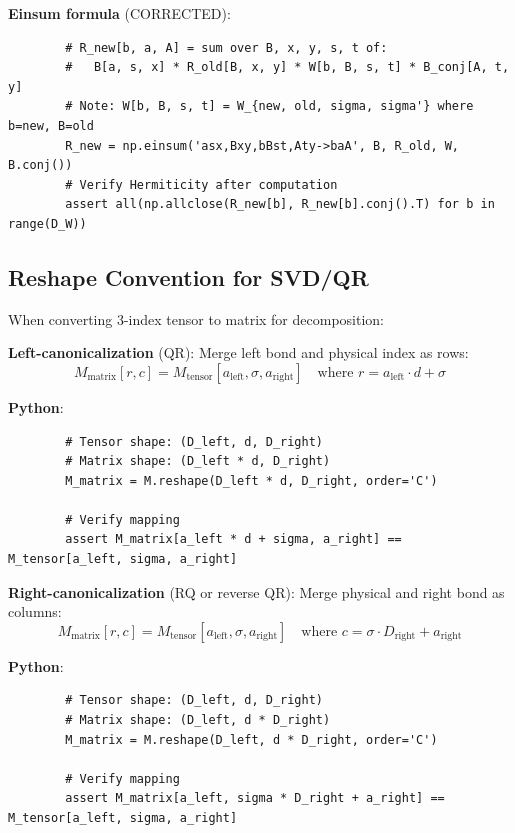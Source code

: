 \documentclass[aps,prb,onecolumn,scriptaddress]{revtex4-2}
\begin{document}
	\textbf{Einsum formula} (CORRECTED):
	\begin{verbatim}
		# R_new[b, a, A] = sum over B, x, y, s, t of:
		#   B[a, s, x] * R_old[B, x, y] * W[b, B, s, t] * B_conj[A, t, y]
		# Note: W[b, B, s, t] = W_{new, old, sigma, sigma'} where b=new, B=old
		R_new = np.einsum('asx,Bxy,bBst,Aty->baA', B, R_old, W, B.conj())
		# Verify Hermiticity after computation
		assert all(np.allclose(R_new[b], R_new[b].conj().T) for b in range(D_W))
	\end{verbatim}
	
	\subsection{Reshape Convention for SVD/QR}
	
	When converting 3-index tensor to matrix for decomposition:
	
	\textbf{Left-canonicalization} (QR): Merge left bond and physical index as rows:
	\begin{equation}
		\boxed{M_{\text{matrix}}[r, c] = M_{\text{tensor}}[a_{\text{left}}, \sigma, a_{\text{right}}] \quad \text{where } r = a_{\text{left}} \cdot d + \sigma}
	\end{equation}
	
	\textbf{Python}:
	\begin{verbatim}
		# Tensor shape: (D_left, d, D_right)
		# Matrix shape: (D_left * d, D_right)
		M_matrix = M.reshape(D_left * d, D_right, order='C')
		
		# Verify mapping
		assert M_matrix[a_left * d + sigma, a_right] == M_tensor[a_left, sigma, a_right]
	\end{verbatim}
	
	\textbf{Right-canonicalization} (RQ or reverse QR): Merge physical and right bond as columns:
	\begin{equation}
		\boxed{M_{\text{matrix}}[r, c] = M_{\text{tensor}}[a_{\text{left}}, \sigma, a_{\text{right}}] \quad \text{where } c = \sigma \cdot D_{\text{right}} + a_{\text{right}}}
	\end{equation}
	
	\textbf{Python}:
	\begin{verbatim}
		# Tensor shape: (D_left, d, D_right)
		# Matrix shape: (D_left, d * D_right)
		M_matrix = M.reshape(D_left, d * D_right, order='C')
		
		# Verify mapping
		assert M_matrix[a_left, sigma * D_right + a_right] == M_tensor[a_left, sigma, a_right]
	\end{verbatim}
	
\end{document}
